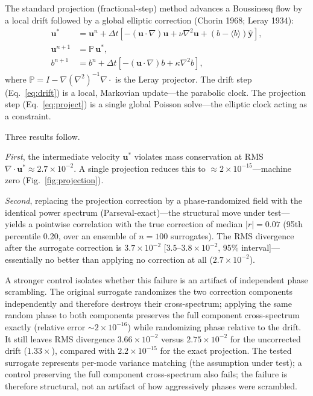 \documentclass[11pt]{article}
\begin{document}
The standard projection (fractional-step) method advances a Boussinesq flow by a local drift followed by a global elliptic correction (Chorin 1968; Leray 1934):
\begin{align}
\mathbf{u}^* &= \mathbf{u}^n + \Delta t\left[
-(\mathbf{u}\cdot\nabla)\mathbf{u} + \nu\nabla^2\mathbf{u}
+ (b - \langle b\rangle)\hat{\mathbf{y}}\right],
\label{eq:drift}\\
\mathbf{u}^{n+1} &= \mathbb{P}\,\mathbf{u}^*,
\label{eq:project}\\
b^{n+1} &= b^n + \Delta t\left[
-(\mathbf{u}\cdot\nabla)b + \kappa\nabla^2 b\right],
\label{eq:scalar_step}
\end{align}
where $\mathbb{P} = I - \nabla(\nabla^2)^{-1}\nabla\cdot$ is the Leray projector.
The drift step (Eq.~\ref{eq:drift}) is a local, Markovian update---the parabolic clock. The projection step (Eq.~\ref{eq:project}) is a single global Poisson solve---the elliptic clock acting as a constraint.

Three results follow.

\emph{First}, the intermediate velocity $\mathbf{u}^*$ violates mass conservation at RMS $\nabla\cdot\mathbf{u}^* \approx 2.7\times 10^{-2}$. A single projection reduces this to $\approx 2\times 10^{-15}$---machine zero (Fig.~\ref{fig:projection}).

\emph{Second}, replacing the projection correction by a phase-randomized field with the identical power spectrum (Parseval-exact)---the structural move under test---yields a pointwise correlation with the true correction of median $|r| = 0.07$ (95th percentile 0.20, over an ensemble of $n = 100$ surrogates). The RMS divergence after the surrogate correction is $3.7\times 10^{-2}$ [$3.5$--$3.8\times 10^{-2}$, 95\% interval]---essentially no better than applying no correction at all ($2.7\times 10^{-2}$).

A stronger control isolates whether this failure is an artifact of independent phase scrambling. The original surrogate randomizes the two correction components independently and therefore destroys their cross-spectrum; applying the same random phase to both components preserves the full component cross-spectrum exactly (relative error $\sim2\times10^{-16}$) while randomizing phase relative to the drift. It still leaves RMS divergence $3.66\times10^{-2}$ versus $2.75\times10^{-2}$ for the uncorrected drift ($1.33\times$), compared with $2.2\times10^{-15}$ for the exact projection. The tested surrogate represents per-mode variance matching (the assumption under test); a control preserving the full component cross-spectrum also fails; the failure is therefore structural, not an artifact of how aggressively phases were scrambled.
\end{document}
